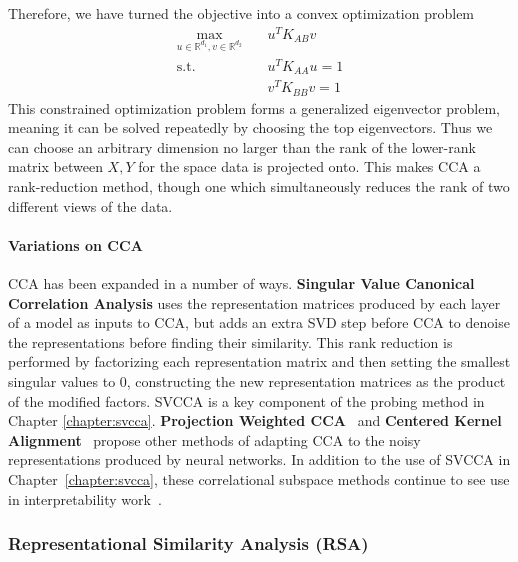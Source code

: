 Therefore, we have turned the objective into a convex optimization problem
\begin{equation}
\begin{aligned}
    \max_{u \in \mathbb{R}^{d_1}, v \in \mathbb{R}^{d_2}} \quad & u^T K_{AB} v\\
    \textrm{s.t.} \quad & u^T K_{AA} u = 1\\
    \quad & v^T K_{BB} v = 1
\end{aligned} 
\end{equation}
This constrained optimization problem forms a generalized eigenvector problem, meaning it can be solved repeatedly by choosing the top eigenvectors. Thus we can choose an arbitrary dimension no larger than the rank of the lower-rank matrix between $X, Y$ for the space data is projected onto. This makes CCA a rank-reduction method, though one which simultaneously reduces the rank of two different views of the data.


\paragraph{Variations on CCA} \label{sec:svcca}

CCA has been expanded in a number of ways. \textbf{Singular Value Canonical Correlation Analysis} \citep[SVCCA; ][]{raghu_svcca:_2017} uses the representation matrices produced by each layer of a model as inputs to CCA, but adds an extra SVD step before CCA to denoise the representations before finding their similarity. This rank reduction is performed by factorizing each representation matrix and then setting the smallest singular values to 0, constructing the new representation matrices as the product of the modified factors. SVCCA is a key component of the probing method in Chapter \ref{chapter:svcca}. \textbf{Projection Weighted CCA}~\citep[PWCCA; ][]{morcos_insights_2018} and \textbf{Centered Kernel Alignment}~\citep[CKA; ][]{kornblith_similarity_2019} propose other methods of adapting CCA to the noisy representations produced by neural networks.  In addition to the use of SVCCA  in Chapter~\ref{chapter:svcca}, these correlational subspace methods continue to see use in interpretability work~\citep{voita_bottom-up_2019,wu_similarity_2020,hao_investigating_2020}.

\subsubsection{Representational Similarity Analysis (RSA)} 

